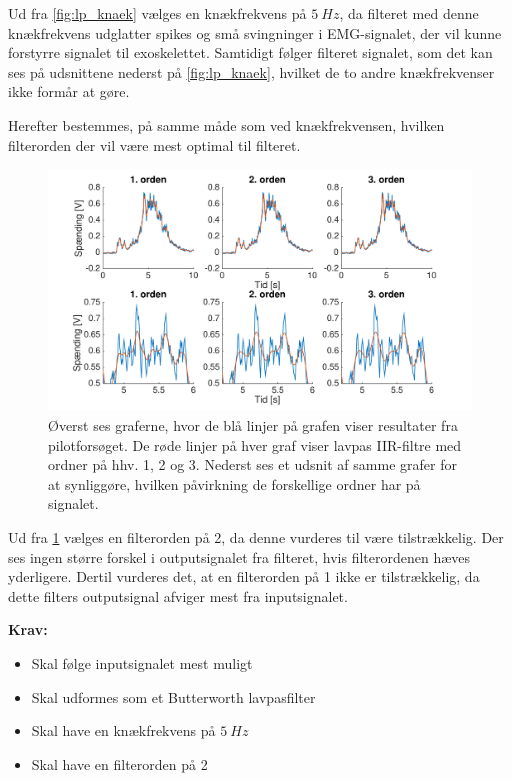 \noindent
Ud fra \ref{fig:lp_knaek} vælges en knækfrekvens på $5~Hz$, da filteret med denne knækfrekvens udglatter spikes og små svingninger i EMG-signalet, der vil kunne forstyrre signalet til exoskelettet. Samtidigt følger filteret signalet, som det kan ses på udsnittene nederst på \ref{fig:lp_knaek}, hvilket de to andre knækfrekvenser ikke formår at gøre.

Herefter bestemmes, på samme måde som ved knækfrekvensen, hvilken filterorden der vil være mest optimal til filteret. 

\begin{figure} [H]
\centering
\includegraphics[width=1.0\textwidth]{figures/problemloesning/lavpas_orden.pdf}
\caption{Øverst ses graferne, hvor de blå linjer på grafen viser resultater fra pilotforsøget. De røde linjer på hver graf viser lavpas IIR-filtre med ordner på hhv. 1, 2 og 3. Nederst ses et udsnit af samme grafer for at synliggøre, hvilken påvirkning de forskellige ordner har på signalet.}
\label{fig:lp_orden}
\end{figure} 

\noindent
Ud fra \ref{fig:lp_orden} vælges en filterorden på 2, da denne vurderes til være tilstrækkelig. Der ses ingen større forskel i outputsignalet fra filteret, hvis filterordenen hæves yderligere. Dertil vurderes det, at en filterorden på 1 ikke er tilstrækkelig, da dette filters outputsignal afviger mest fra inputsignalet. 

\vspace{3mm}

\textbf{Krav:}
\begin{itemize}
\item Skal følge inputsignalet mest muligt  
\item Skal udformes som et Butterworth lavpasfilter
\item Skal have en knækfrekvens på $5~Hz$
\item Skal have en filterorden på 2
\end{itemize}

